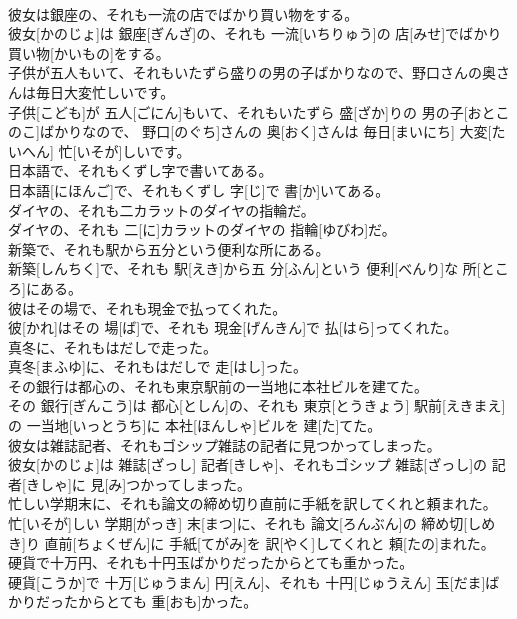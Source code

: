 \documentclass[8pt]{extreport}
\begin{document}
\begin{CJK}{UTF8}{min}
\\	彼女は銀座の、それも一流の店でばかり買い物をする。	
\\	彼女[かのじょ]は 銀座[ぎんざ]の、それも 一流[いちりゅう]の 店[みせ]でばかり 買い物[かいもの]をする。
\\	子供が五人もいて、それもいたずら盛りの男の子ばかりなので、野口さんの奥さんは毎日大変忙しいです。	
\\	子供[こども]が 五人[ごにん]もいて、それもいたずら 盛[ざか]りの 男の子[おとこのこ]ばかりなので、 野口[のぐち]さんの 奥[おく]さんは 毎日[まいにち] 大変[たいへん] 忙[いそが]しいです。
\\	日本語で、それもくずし字で書いてある。	
\\	日本語[にほんご]で、それもくずし 字[じ]で 書[か]いてある。
\\	ダイヤの、それも二カラットのダイヤの指輪だ。	
\\	ダイヤの、それも 二[に]カラットのダイヤの 指輪[ゆびわ]だ。
\\	新築で、それも駅から五分という便利な所にある。	
\\	新築[しんちく]で、それも 駅[えき]から五 分[ふん]という 便利[べんり]な 所[ところ]にある。
\\	彼はその場で、それも現金で払ってくれた。	
\\	彼[かれ]はその 場[ば]で、それも 現金[げんきん]で 払[はら]ってくれた。
\\	真冬に、それもはだしで走った。	
\\	真冬[まふゆ]に、それもはだしで 走[はし]った。
\\	その銀行は都心の、それも東京駅前の一当地に本社ビルを建てた。	
\\	その 銀行[ぎんこう]は 都心[としん]の、それも 東京[とうきょう] 駅前[えきまえ]の 一当地[いっとうち]に 本社[ほんしゃ]ビルを 建[た]てた。
\\	彼女は雑誌記者、それもゴシップ雑誌の記者に見つかってしまった。	
\\	彼女[かのじょ]は 雑誌[ざっし] 記者[きしゃ]、それもゴシップ 雑誌[ざっし]の 記者[きしゃ]に 見[み]つかってしまった。
\\	忙しい学期末に、それも論文の締め切り直前に手紙を訳してくれと頼まれた。	
\\	忙[いそが]しい 学期[がっき] 末[まつ]に、それも 論文[ろんぶん]の 締め切[しめき]り 直前[ちょくぜん]に 手紙[てがみ]を 訳[やく]してくれと 頼[たの]まれた。
\\	硬貨で十万円、それも十円玉ばかりだったからとても重かった。	
\\	硬貨[こうか]で 十万[じゅうまん] 円[えん]、それも 十円[じゅうえん] 玉[だま]ばかりだったからとても 重[おも]かった。

\end{CJK}
\end{document}
